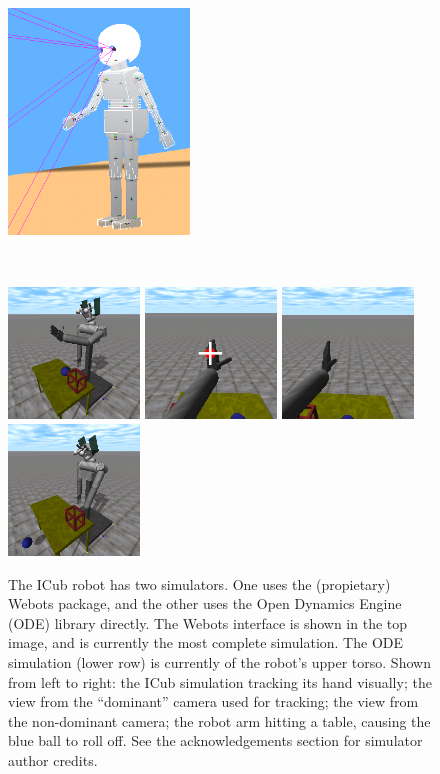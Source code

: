 \begin{figure}[tbp]
\centerline{
\includegraphics[height=6cm]{sim-webot-detail}
}
\ \\
\centerline{
\includegraphics[width=3.5cm]{sim-ode-wide} 
\includegraphics[width=3.5cm]{sim-ode-left} 
\includegraphics[width=3.5cm]{sim-ode-right}
\includegraphics[width=3.5cm]{sim-ode-knock}
}
\caption{
%
The ICub robot has two simulators.
One uses the (propietary) Webots package, and the other uses
the Open Dynamics Engine (ODE) library directly.
The Webots interface is shown in the top image, and is currently
the most complete simulation.  The ODE simulation (lower row)
is currently of the robot's upper torso.  Shown from left to
right: the ICub simulation tracking its hand visually;
the view from the ``dominant'' camera used for tracking; the
view from the non-dominant camera; the robot arm hitting
a table, causing the blue ball to roll off.
%
See the acknowledgements section for simulator author credits.
} 
\label{fig:simulators}
\end{figure}
